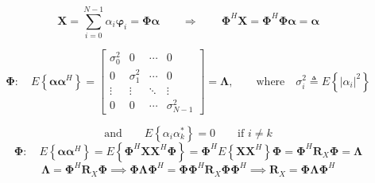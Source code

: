 \[
\mathbf{X} = \sum_{i=0}^{N-1} \alpha_i \boldsymbol{\varphi}_i = \mathbf{\Phi} \boldsymbol{\alpha}
\qquad \Rightarrow \qquad
\mathbf{\Phi}^H \mathbf{X} = \mathbf{\Phi}^H \mathbf{\Phi} \boldsymbol{\alpha} = \boldsymbol{\alpha}
\]

\[
\mathbf{\Phi} : \quad E\left\{ \boldsymbol{\alpha} \boldsymbol{\alpha}^H \right\} = 
\begin{bmatrix}
\sigma_0^2 & 0 & \cdots & 0 \\
0 & \sigma_1^2 & \cdots & 0 \\
\vdots & \vdots & \ddots & \vdots \\
0 & 0 & \cdots & \sigma_{N-1}^2
\end{bmatrix}
= \mathbf{\Lambda}, \qquad
\text{where} \quad \sigma_i^2 \triangleq E\left\{ |\alpha_i|^2 \right\}
\]

\[
\text{and} \qquad E\left\{ \alpha_i \alpha_k^* \right\} = 0 \qquad \text{if } i \ne k
\]
\newpage
\[
\mathbf{\Phi} : \quad E \left\{ \boldsymbol{\alpha} \boldsymbol{\alpha}^H \right\} 
= E \left\{ \mathbf{\Phi}^H \mathbf{X} \mathbf{X}^H \mathbf{\Phi} \right\}
= \mathbf{\Phi}^H E \left\{ \mathbf{X} \mathbf{X}^H \right\} \mathbf{\Phi}
= \mathbf{\Phi}^H \mathbf{R}_X \mathbf{\Phi}
= \mathbf{\Lambda}
\]
\[
\mathbf{\Lambda} = \mathbf{\Phi}^H \mathbf{R}_X \mathbf{\Phi}
\implies
\mathbf{\Phi} \mathbf{\Lambda} \mathbf{\Phi}^H = \mathbf{\Phi} \mathbf{\Phi}^H \mathbf{R}_X \mathbf{\Phi} \mathbf{\Phi}^H
\implies
\mathbf{R}_X = \mathbf{\Phi} \mathbf{\Lambda} \mathbf{\Phi}^H
\]
